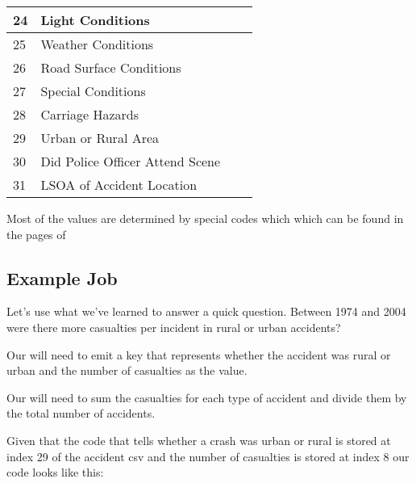 \documentclass[letterpaper,10pt,openany,oneside]{sphinxmanual}
\begin{document}
\begin{longtable}{|l|l|l|l|}
24
 & 
Light Conditions
 &  & \\\hline

25
 & 
Weather Conditions
 &  & \\\hline

26
 & 
Road Surface Conditions
 &  & \\\hline

27
 & 
Special Conditions
 &  & \\\hline

28
 & 
Carriage Hazards
 &  & \\\hline

29
 & 
Urban or Rural Area
 &  & \\\hline

30
 & 
Did Police Officer Attend Scene
 &  & \\\hline

31
 & 
LSOA of Accident Location
 &  & \\\hline
\end{longtable}


Most of the values are determined by special codes which
which can be found in the pages of


\subsection{Example Job}
\label{0-TrafficDataset/Introduction:example-job}
Let's use what we've learned to answer a quick question.
Between 1974 and 2004 were there more casualties per
incident in rural or urban accidents?

Our  will need to emit a key
that represents whether the accident was rural or urban and the number
of casualties as the value.

Our  will need to sum the
casualties for each type of accident and divide them by the total number
of accidents.

Given that the code that tells whether a crash was urban or
rural is stored at index 29 of the accident csv and the
number of casualties is stored at index 8 our code looks like
this:
\end{document}
